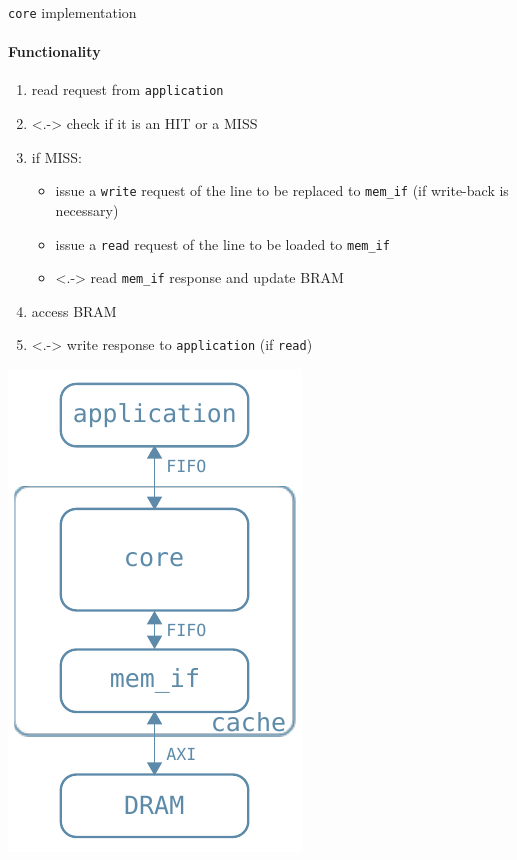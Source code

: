 \documentclass[handout,aspectratio=169]{beamer}
\begin{document}
\begin{frame}{\texttt{core} implementation}
	\framesubtitle{Functionality}
	\begin{minipage}{.7\textwidth}
		\begin{enumerate}[<+->]
			\item read request from \texttt{application}
			\item<.-> check if it is an HIT or a MISS
			\item if MISS: 
				\begin{itemize}
					\item issue a \texttt{write} request of
						the line to be replaced to
						\texttt{mem\_if} (if write-back
						is necessary)
					\item issue a \texttt{read} request of the
						line to be loaded to \texttt{mem\_if}
					\item<.-> read \texttt{mem\_if} response and
						update BRAM

				\end{itemize}
			\item access BRAM
			\item<.-> write response to \texttt{application}
				(if \texttt{read})
		\end{enumerate}
	\end{minipage}
	\begin{minipage}{.28\textwidth}
		\begin{center}
			\includegraphics[width=.8\textwidth]{internal_arch.pdf}
		\end{center}
	\end{minipage}
\end{frame}
\end{document}
